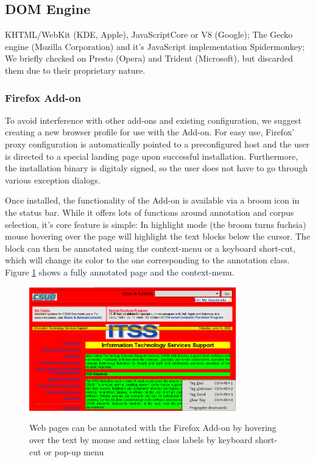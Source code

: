 \subsection{DOM Engine}


KHTML/WebKit (KDE, Apple), JavaScriptCore or V8 (Google);
The Gecko engine (Mozilla Corporation) and it's JavaScript implementation Spidermonkey;
We briefly checked on Presto (Opera) and Trident (Microsoft), but discarded them due to their proprietary nature.

\subsubsection{Firefox Add-on}

To avoid interference with other add-ons and existing configuration, we suggest creating a new browser profile for use with the Add-on.
For easy use, Firefox' proxy configuration is automatically pointed to a preconfigured host and the user is directed to a special landing page upon successful installation.
Furthermore, the installation binary is digitaly signed, so the user does not have to go through various exception dialogs.


Once installed, the functionality of the Add-on is available via a broom icon in the status bar.
While it offers lots of functions around annotation and corpus selection, it's core feature is simple:
In highlight mode (the broom turns fuchsia) mouse hovering over the page will highlight the text blocks below the cursor.
The block can then be annotated using the context-menu or a keyboard short-cut, which will change its color to the one corresponding to the annotation class.
Figure \ref{f:tut0} shows a fully annotated page and the context-menu.

\begin{figure}
	{\includegraphics[width=0.8\textwidth]{tut0}}
\caption{\label{f:tut0}Web pages can be annotated with the \KrdWrd Firefox Add-on by hovering over the text by mouse and setting class labels by keyboard short-cut or pop-up menu}
\end{figure}


